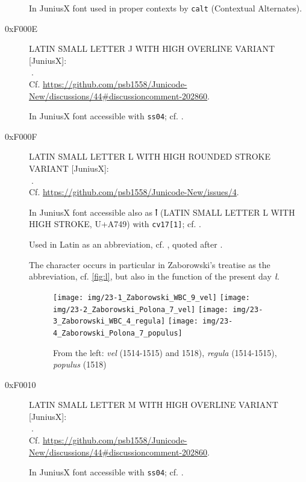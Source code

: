 \documentclass{article}
\newcommand{\Jglyph}[1]{{\relsize{2}\J#1}}
\begin{document}
\begin{description}
  In JuniusX font used
  in proper contexts by \texttt{calt} (Contextual Alternates).

\item [0xF000E] LATIN SMALL LETTER J WITH HIGH OVERLINE VARIANT [JuniusX]:\\
  \Jglyph{󰀎}.\\ Cf. \url{https://github.com/psb1558/Junicode-New/discussions/44#discussioncomment-202860}.

  In JuniusX font accessible  with \texttt{ss04};
  cf. \autocite[p. 6]{baker20:_opent_featur_junius_junius}.

\item [0xF000F] LATIN SMALL LETTER L WITH HIGH ROUNDED STROKE VARIANT [JuniusX]:\\
  \Jglyph{󰀏}.\\  Cf. \url{https://github.com/psb1558/Junicode-New/issues/4}.

  In JuniusX font accessible also as
  ꝉ
  (LATIN SMALL LETTER L WITH HIGH STROKE,
 U+A749) with \texttt{cv17[1]};
  cf. \autocite[p. 9]{baker20:_opent_featur_junius_junius}.

  Used in Latin as an abbreviation, cf. \autocite{balbi1460:_cathol},
  quoted after \autocite[s. 6]{N3027}. 
  
  The character occurs in particular in Zaborowski's treatise as the
  abbreviation, cf. \vref{fig:l}, but also in the function of the
  present day \textit{ł}.

  \begin{figure}[h]
    \centering
    \texttt{[image: img/23-1\_Zaborowski\_WBC\_9\_vel]}
    \texttt{[image: img/23-2\_Zaborowski\_Polona\_7\_vel]}
    \texttt{[image: img/23-3\_Zaborowski\_WBC\_4\_regula]}
    \texttt{[image: img/23-4\_Zaborowski\_Polona\_7\_populus]}
    \caption{From the left: \textit{vel} (1514-1515) and 1518), \textit{regula} (1514-1515), \textit{populus} (1518)}
    \label{fig:l}
  \end{figure}
  
\item [0xF0010] LATIN SMALL LETTER M WITH HIGH OVERLINE VARIANT [JuniusX]:\\
  \Jglyph{󰀐}.\\ Cf. \url{https://github.com/psb1558/Junicode-New/discussions/44#discussioncomment-202860}.

  In JuniusX font accessible  with \texttt{ss04};
  cf. \autocite[p. 6]{baker20:_opent_featur_junius_junius}.


\end{description}
\end{document}
